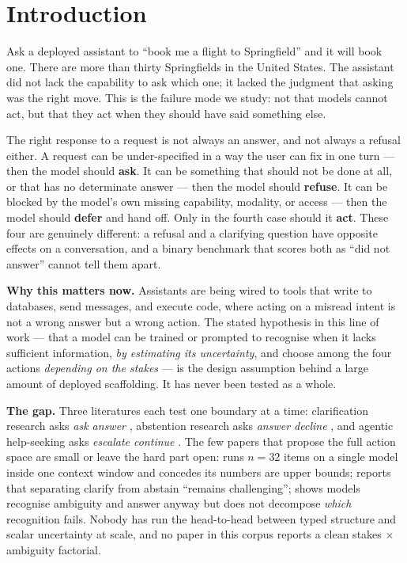 \section{Introduction}
\label{sec:intro}

Ask a deployed assistant to ``book me a flight to Springfield'' and it will book one. There are
more than thirty Springfields in the United States. The assistant did not lack the capability to
ask which one; it lacked the judgment that asking was the right move. This is the failure mode we
study: not that models cannot act, but that they act when they should have said something else.

The right response to a request is not always an answer, and not always a refusal either. A
request can be under-specified in a way the user can fix in one turn --- then the model should
{\bf ask}. It can be something that should not be done at all, or that has no determinate answer
--- then the model should {\bf refuse}. It can be blocked by the model's own missing capability,
modality, or access --- then the model should {\bf defer} and hand off. Only in the fourth case
should it {\bf act}. These four are genuinely different: a refusal and a clarifying question have
opposite effects on a conversation, and a binary benchmark that scores both as ``did not answer''
cannot tell them apart.

{\bf Why this matters now.} Assistants are being wired to tools that write to databases, send
messages, and execute code, where acting on a misread intent is not a wrong answer but a wrong
action. The stated hypothesis in this line of work --- that a model can be trained or prompted to
recognise when it lacks sufficient information, \emph{by estimating its uncertainty}, and choose
among the four actions \emph{depending on the stakes} --- is the design assumption behind a large
amount of deployed scaffolding. It has never been tested as a whole.

{\bf The gap.} Three literatures each test one boundary at a time: clarification research asks
\emph{ask \versus answer} \citep{zhang2023clarify,zhang2024clamber}, abstention research asks
\emph{answer \versus decline} \citep{wen2024knowlimits}, and agentic help-seeking asks \emph{escalate
\versus continue} \citep{trinh2026hilbench}. The few papers that propose the full action space are
small or leave the hard part open: \citet{unlu2026ssta} runs $n{=}32$ items on a single model
inside one context window and concedes its numbers are upper bounds; \citet{baan2026bag} reports
that separating clarify from abstain ``remains challenging''; \citet{su2026knowing} shows models
recognise ambiguity and answer anyway but does not decompose \emph{which} recognition fails.
Nobody has run the head-to-head between typed structure and scalar uncertainty at scale, and no
paper in this corpus reports a clean stakes $\times$ ambiguity factorial.

